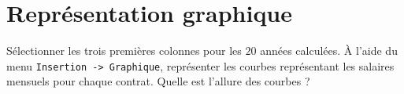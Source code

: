 \documentclass[10pt,french]{article}
\begin{document}
\section*{Représentation graphique}
Sélectionner les trois premières colonnes pour les $20$ années calculées. À l'aide du menu \texttt{Insertion -> Graphique}, représenter les courbes représentant les salaires mensuels pour chaque contrat. Quelle est l'allure des courbes ?\par\bigskip\dotfill\par\bigskip\dotfill
\end{document}
